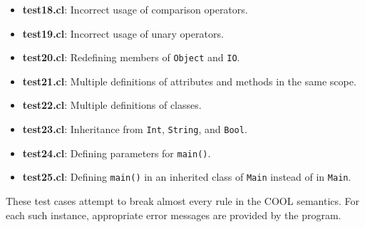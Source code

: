 \documentclass{article}
\begin{document}
\begin{itemize}
	\item \textbf{test18.cl}: Incorrect usage of comparison operators.
	\item \textbf{test19.cl}: Incorrect usage of unary operators.
	\item \textbf{test20.cl}: Redefining members of \verb|Object| and \verb|IO|.
	\item \textbf{test21.cl}: Multiple definitions of attributes and methods in the same scope.
	\item \textbf{test22.cl}: Multiple definitions of classes.
	\item \textbf{test23.cl}: Inheritance from \verb|Int|, \verb|String|, and \verb|Bool|.
	\item \textbf{test24.cl}: Defining parameters for \verb|main()|.
	\item \textbf{test25.cl}: Defining \verb|main()| in an inherited class of \verb|Main| instead of in \verb|Main|.
\end{itemize}
These test cases attempt to break almost every rule in the COOL semantics. For each such instance, appropriate error messages are provided by the program.
\end{document}
